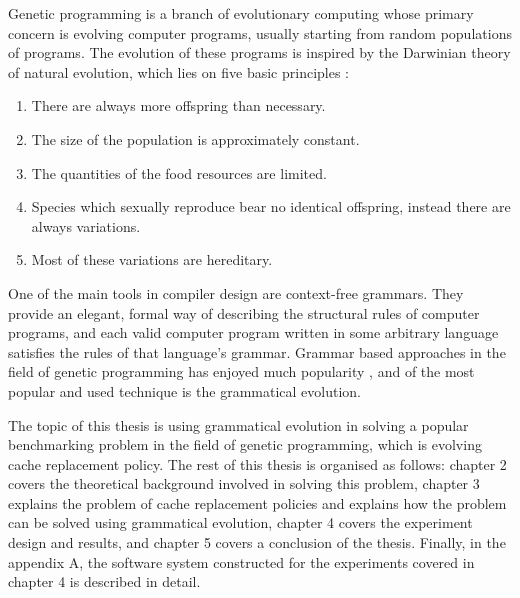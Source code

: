 Genetic programming is a branch of evolutionary computing whose primary concern is evolving computer programs, usually starting from random populations of programs. The evolution of these programs is inspired by the Darwinian theory of natural evolution, which lies on five basic principles \citep{cupic2019evolucijskoracunarstvo}:

\begin{enumerate}
	\item There are always more offspring than necessary.
	\item The size of the population is approximately constant.
	\item The quantities of the food resources are limited.
	\item Species which sexually reproduce bear no identical offspring, instead there are always variations.
	\item Most of these variations are hereditary.
\end{enumerate}

One of the main tools in compiler design are context-free grammars. They provide an elegant, formal way of describing the structural rules of computer programs, and each valid computer program written in some arbitrary language satisfies the rules of that language's grammar. Grammar based approaches in the field of genetic programming has enjoyed much popularity \citep{neill2003grammaticalevolution}, and of the most popular and used technique is the grammatical evolution.

The topic of this thesis is using grammatical evolution in solving a popular benchmarking problem in the field of genetic programming, which is evolving cache replacement policy. The rest of this thesis is organised as follows: chapter 2 covers the theoretical background involved in solving this problem, chapter 3 explains the problem of cache replacement policies and explains how the problem can be solved using grammatical evolution, chapter 4 covers the experiment design and results, and chapter 5 covers a conclusion of the thesis. Finally, in the appendix A, the software system constructed for the experiments covered in chapter 4 is described in detail.